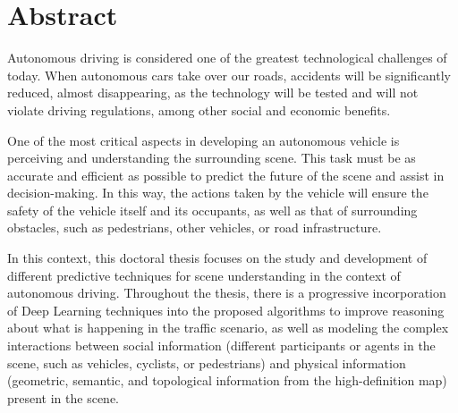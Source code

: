 %
%
%
% 
%
%
%
%

\chapter*{Abstract}
\label{cha:abstract}


Autonomous driving is considered one of the greatest technological challenges of today. When autonomous cars take over our roads, accidents will be significantly reduced, almost disappearing, as the technology will be tested and will not violate driving regulations, among other social and economic benefits.

One of the most critical aspects in developing an autonomous vehicle is perceiving and understanding the surrounding scene. This task must be as accurate and efficient as possible to predict the future of the scene and assist in decision-making. In this way, the actions taken by the vehicle will ensure the safety of the vehicle itself and its occupants, as well as that of surrounding obstacles, such as pedestrians, other vehicles, or road infrastructure.

In this context, this doctoral thesis focuses on the study and development of different predictive techniques for scene understanding in the context of autonomous driving. Throughout the thesis, there is a progressive incorporation of Deep Learning techniques into the proposed algorithms to improve reasoning about what is happening in the traffic scenario, as well as modeling the complex interactions between social information (different participants or agents in the scene, such as vehicles, cyclists, or pedestrians) and physical information (geometric, semantic, and topological information from the high-definition map) present in the scene.


